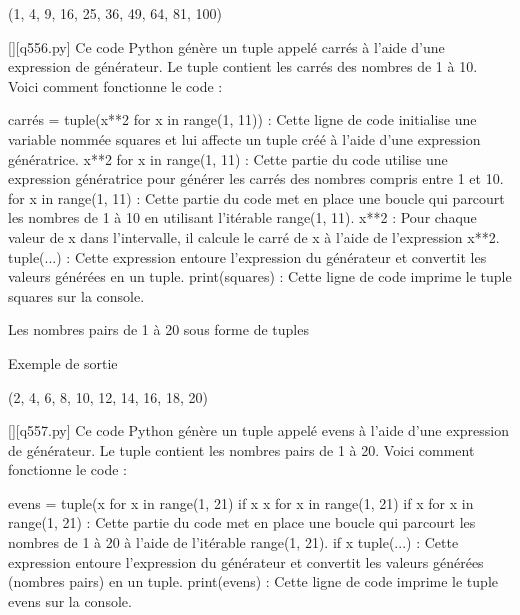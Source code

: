 (1, 4, 9, 16, 25, 36, 49, 64, 81, 100)
        \par
        \begin{solution}
            \renewcommand{\nomfichier}{q556.py}
            \pythonfile{\chemincode \nomfichier}[][\nomfichier]
            Ce code Python génère un tuple appelé carrés à l'aide d'une expression de générateur. Le tuple contient les carrés des nombres de 1 à 10. Voici comment fonctionne le code :

    carrés = tuple(x**2 for x in range(1, 11)) : Cette ligne de code initialise une variable nommée squares et lui affecte un tuple créé à l'aide d'une expression génératrice.
        x**2 for x in range(1, 11) : Cette partie du code utilise une expression génératrice pour générer les carrés des nombres compris entre 1 et 10.
            for x in range(1, 11) : Cette partie du code met en place une boucle qui parcourt les nombres de 1 à 10 en utilisant l'itérable range(1, 11).
            x**2 : Pour chaque valeur de x dans l'intervalle, il calcule le carré de x à l'aide de l'expression x**2.
        tuple(...) : Cette expression entoure l'expression du générateur et convertit les valeurs générées en un tuple.
    print(squares) : Cette ligne de code imprime le tuple squares sur la console.
        \end{solution}
        

        \question
        Les nombres pairs de 1 à 20 sous forme de tuples

Exemple de sortie

(2, 4, 6, 8, 10, 12, 14, 16, 18, 20)
        \par
        \begin{solution}
            \renewcommand{\nomfichier}{q557.py}
            \pythonfile{\chemincode \nomfichier}[][\nomfichier]
            Ce code Python génère un tuple appelé evens à l'aide d'une expression de générateur. Le tuple contient les nombres pairs de 1 à 20. Voici comment fonctionne le code :

    evens = tuple(x for x in range(1, 21) if x %
        x for x in range(1, 21) if x %
            for x in range(1, 21) : Cette partie du code met en place une boucle qui parcourt les nombres de 1 à 20 à l'aide de l'itérable range(1, 21).
            if x %
        tuple(...) : Cette expression entoure l'expression du générateur et convertit les valeurs générées (nombres pairs) en un tuple.
    print(evens) : Cette ligne de code imprime le tuple evens sur la console.
        \end{solution}
        

